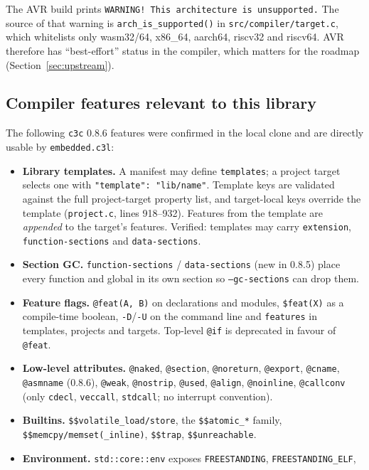 \documentclass[11pt,a4paper]{article}
\newcommand{\pkg}[1]{\texttt{#1}}
\begin{document}
\noindent
The AVR build prints \texttt{WARNING! This architecture is unsupported.}
The source of that warning is \pkg{arch\_is\_supported()} in \pkg{src/compiler/target.c}, which
whitelists only wasm32/64, x86\_64, aarch64, riscv32 and riscv64. AVR therefore has
``best-effort'' status in the compiler, which matters for the roadmap (Section~\ref{sec:upstream}).

\subsection{Compiler features relevant to this library}

The following \pkg{c3c} 0.8.6 features were confirmed in the local clone and are directly
usable by \pkg{embedded.c3l}:

\begin{itemize}
  \item \textbf{Library templates.} A manifest may define \pkg{templates}; a project target
        selects one with \pkg{"template": "lib/name"}. Template keys are validated against the
        full project-target property list, and target-local keys override the template
        (\pkg{project.c}, lines 918--932). Features from the template are \emph{appended} to the
        target's features. Verified: templates may carry \pkg{extension},
        \pkg{function-sections} and \pkg{data-sections}.
  \item \textbf{Section GC.} \pkg{function-sections} / \pkg{data-sections} (new in 0.8.5) place every
        function and global in its own section so \pkg{--gc-sections} can drop them.
  \item \textbf{Feature flags.} \pkg{@feat(A, B)} on declarations and modules, \pkg{\$feat(X)} as a
        compile-time boolean, \pkg{-D}/\pkg{-U} on the command line and \pkg{features} in templates,
        projects and targets. Top-level \pkg{@if} is deprecated in favour of \pkg{@feat}.
  \item \textbf{Low-level attributes.} \pkg{@naked}, \pkg{@section}, \pkg{@noreturn}, \pkg{@export},
        \pkg{@cname}, \pkg{@asmname} (0.8.6), \pkg{@weak}, \pkg{@nostrip}, \pkg{@used}, \pkg{@align},
        \pkg{@noinline}, \pkg{@callconv} (only \pkg{cdecl}, \pkg{veccall}, \pkg{stdcall}; no interrupt
        convention).
  \item \textbf{Builtins.} \pkg{\$\$volatile\_load/store}, the \pkg{\$\$atomic\_*} family,
        \pkg{\$\$memcpy/memset(\_inline)}, \pkg{\$\$trap}, \pkg{\$\$unreachable}.
  \item \textbf{Environment.} \pkg{std::core::env} exposes \pkg{FREESTANDING}, \pkg{FREESTANDING\_ELF},

\end{itemize}
\end{document}
